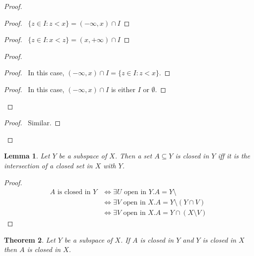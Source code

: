 \documentclass{book}
\newtheorem{lm}{Lemma}[chapter]
\newtheorem{thm}[lm]{Theorem}
\theoremstyle{definition}
\begin{document}
  \begin{proof}
    \begin{proof}
      \pf\ $\{ z \in I : z < x \} = (-\infty, x) \cap I$
    \end{proof}
    \begin{proof}
      \pf\ $\{ z \in I : x < z \} = (x, +\infty) \cap I$
    \end{proof}
    \begin{proof}
      \begin{proof}
        \pf\ In this case, $(-\infty, x) \cap I = \{ z \in I : z < x \}$.
      \end{proof}
      \begin{proof}
        \pf\ In this case, $(-\infty, x) \cap I$ is either $I$ or $\emptyset$.
      \end{proof}
    \end{proof}
    \begin{proof}
      \pf\ Similar.
    \end{proof}
  \end{proof}
  
  \begin{lm}
    \label{lm:topology:subspace:closed}
    Let $Y$ be a subspace of $X$. Then a set $A \subseteq Y$ is closed in $Y$ 
    iff 
    it is the intersection of a closed set in $X$ with $Y$.
  \end{lm}
  
  \begin{proof}
    \pf\ \begin{align*}
      A \text{ is closed in } Y
      & \Leftrightarrow \exists U \text{ open in } Y. A = Y \setminus \\
      & \Leftrightarrow \exists V \text{ open in } X. A = Y \setminus (Y \cap 
      V) \\
      & \Leftrightarrow \exists V \text{ open in } X. A = Y \cap (X \setminus 
      V)
    \end{align*}
  \end{proof}
  
  \begin{thm}
    \label{thm:topology:subspace:closed}
    Let $Y$ be a subspace of $X$. If $A$ is closed in $Y$ and $Y$ is closed in 
    $X$ 
    then $A$ is closed in $X$.
  \end{thm}
  
\end{document}
